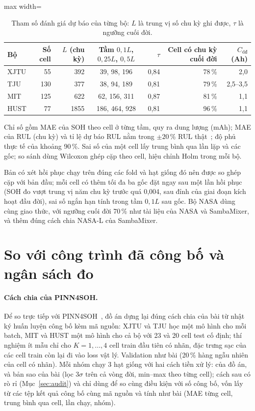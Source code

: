 \documentclass[12pt,a4paper,oneside]{report}
\theoremstyle{plain}
\theoremstyle{definition}
\begin{document}
\begin{table}[!htbp]\centering\small
\caption[Tham số đánh giá dự báo của từng bộ]{Tham số đánh giá dự báo của từng bộ: $L$ là trung vị số chu kỳ ghi được, $\tau$ là ngưỡng cuối đời.}\label{tab:fcset}
\begin{adjustbox}{max width=\textwidth}\begin{tabular}{lrrcrrr}\toprule
Bộ & Số cell & $L$ (chu kỳ) & Tầm $0{,}1L$, $0{,}25L$, $0{,}5L$ & $\tau$ & Cell có chu kỳ cuối đời & $C_\text{dđ}$ (Ah) \\\midrule
XJTU & 55 & 392 & 39, 98, 196 & 0{,}84 & 78\,\% & 2{,}0 \\
TJU & 130 & 377 & 38, 94, 189 & 0{,}81 & 79\,\% & 2{,}5--3{,}5 \\
MIT & 125 & 622 & 62, 156, 311 & 0{,}87 & 81\,\% & 1{,}1 \\
HUST & 77 & 1855 & 186, 464, 928 & 0{,}81 & 96\,\% & 1{,}1 \\
\bottomrule\end{tabular}\end{adjustbox}\end{table}


Chỉ số gồm MAE của SOH theo cell ở từng tầm, quy ra dung lượng (mAh); MAE của RUL (chu kỳ) và tỉ lệ dự báo RUL nằm
trong $\pm 20\,\%$ RUL thật~\cite{saxena2008}; độ phủ thực tế của khoảng 90\,\%. Sai số của một cell lấy trung bình
qua lần lặp và các gốc; so sánh dùng Wilcoxon ghép cặp theo cell, hiệu chỉnh Holm trong mỗi bộ.

Bản có xét hồi phục chạy trên đúng các fold và hạt giống đó nên được so ghép cặp với bản đầu; mỗi cell có thêm tối
đa ba gốc đặt ngay sau một lần hồi phục (SOH đo vượt trung vị năm chu kỳ trước quá 0,004, sau đỉnh của giai đoạn kích
hoạt đầu đời), sai số ngắn hạn tính trong tầm $0{,}1L$ sau gốc. Bộ NASA dùng cùng giao thức, với ngưỡng cuối đời
70\,\% như tài liệu của NASA và SambaMixer, và thêm đúng cách chia NASA-L của SambaMixer.
\section{So với công trình đã công bố và ngân sách đo}\label{sec:newproto}

\paragraph{Cách chia của PINN4SOH.} Để so trực tiếp với PINN4SOH~\cite{wang2024}, đồ án dựng lại đúng cách chia của
bài từ nhật ký huấn luyện công bố kèm mã nguồn: XJTU và TJU học một mô hình cho mỗi batch, MIT và HUST một mô hình cho
cả bộ với 23 và 20 cell test cố định; thí nghiệm ít mẫu chỉ cho $K = 1, \dots, 4$ cell train đầu tiên có nhãn, đặc
trưng sạc của các cell train còn lại đi vào loss vật lý. Validation như bài (20\,\% hàng ngẫu nhiên của cell có nhãn).
Mỗi nhóm chạy 3 hạt giống với hai cách tiền xử lý: của đồ án, và bản sao của bài (lọc $3\sigma$ trên cả vòng đời,
min--max theo từng cell); cách sau có rò rỉ (Mục~\ref{sec:audit}) và chỉ dùng để so cùng điều kiện với số công bố, vốn
lấy từ các tệp kết quả công bố cùng mã nguồn và tính như bài (MAE từng cell, trung bình qua cell, lần chạy, nhóm).
\end{document}
